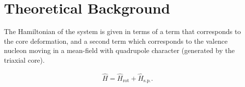 \documentclass[11pt]{article}
\begin{document}
\section{Theoretical Background}

The Hamiltonian of the system is given in terms of a term that corresponds to the core deformation, and a second term which corresponds to the valence nucleon moving in a mean-field with quadrupole character (generated by the triaxial core).

\begin{align}
    \hat{H}=\hat{H}_\text{rot}+\hat{H}_\text{s.p.}.
\end{align}



\end{document}
